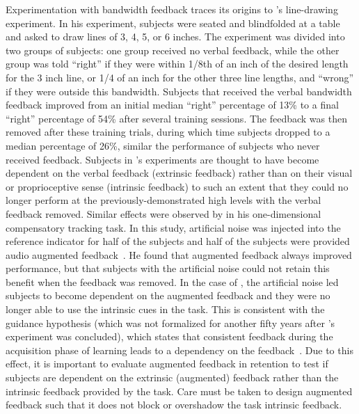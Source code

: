 Experimentation with bandwidth feedback traces its origins to \citeauthor{thorndike_law_1927}'s \citeyear{thorndike_law_1927} line-drawing experiment.
In his experiment, subjects were seated and blindfolded at a table and asked to draw lines of 3, 4, 5, or 6 inches.
The experiment was divided into two groups of subjects: one group received no verbal feedback, while the other group was told ``right'' if they were within 1/8th of an inch of the desired length for the 3 inch line, or 1/4 of an inch for the other three line lengths, and ``wrong'' if they were outside this bandwidth.
Subjects that received the verbal bandwidth feedback improved from an initial median ``right'' percentage of 13\% to a final ``right'' percentage of 54\% after several training sessions.
The feedback was then removed after these training trials, during which time subjects dropped to a median percentage of 26\%, similar the performance of subjects who never received feedback.
Subjects in \citeauthor{thorndike_law_1927}'s experiments are thought to have become dependent on the verbal feedback (extrinsic feedback) rather than on their visual or proprioceptive sense (intrinsic feedback) to such an extent that they could no longer perform at the previously-demonstrated high levels with the verbal feedback removed.
Similar effects were observed by \citeauthor{kinkade1963differential} in his one-dimensional compensatory tracking task.
In this study, artificial noise was injected into the reference indicator for half of the subjects and half of the subjects were provided audio augmented feedback~\citep{kinkade1963differential}.
He found that augmented feedback always improved performance, but that subjects with the artificial noise could not retain this benefit when the feedback was removed.
In the case of \citet{kinkade1963differential}, the artificial noise led subjects to become dependent on the augmented feedback and they were no longer able to use the intrinsic cues in the task.
This is consistent with the guidance hypothesis (which was not formalized for another fifty years after \citeauthor{thorndike_law_1927}'s experiment was concluded), which states that consistent feedback during the acquisition phase of learning leads to a dependency on the feedback~\citep{salmoni_knowledge_1984}.
Due to this effect, it is important to evaluate augmented feedback in retention to test if subjects are dependent on the extrinsic (augmented) feedback rather than the intrinsic feedback provided by the task.
Care must be taken to design augmented feedback such that it does not block or overshadow the task intrinsic feedback.

